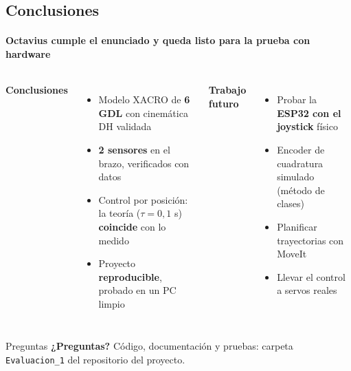 \subsection{Conclusiones}
\begin{frame}{\insertsectionhead}
  \framesubtitle{Octavius cumple el enunciado y queda listo para la prueba con hardware}
  \begin{columns}[t, onlytextwidth]
    \textbf{Conclusiones}
    \begin{itemize}
      \item Modelo XACRO de \textbf{6 GDL} con cinemática DH validada
      \item \textbf{2 sensores} en el brazo, verificados con datos
      \item Control por posición: la teoría ($\tau = 0{,}1$ s) \textbf{coincide} con lo medido
      \item Proyecto \textbf{reproducible}, probado en un PC limpio
    \end{itemize}
    \textbf{Trabajo futuro}
    \begin{itemize}
      \item Probar la \textbf{ESP32 con el joystick} físico
      \item Encoder de cuadratura simulado (método de clases)
      \item Planificar trayectorias con MoveIt
      \item Llevar el control a servos reales
    \end{itemize}
  \end{columns}
\end{frame}

\begin{frame}{Preguntas}
  \centering
  {\Huge\bfseries\color{tAccent} ¿Preguntas?}
  \vfill
  {\small Código, documentación y pruebas: carpeta \texttt{Evaluacion\_1} del repositorio del proyecto.}
\end{frame}

\appendix

